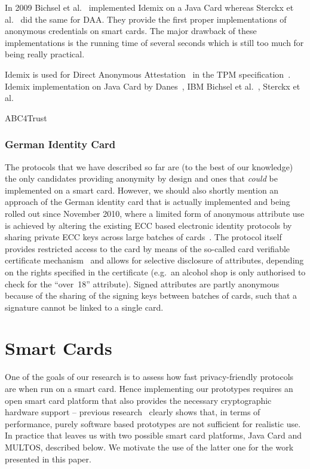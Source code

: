 In 2009 Bichsel et al.~\cite{BichselCGS2009} implemented Idemix on a Java
Card whereas Sterckx et al.~\cite{Sterckx09} did the same for DAA. They
provide the first proper implementations of anonymous credentials on smart
cards. The major drawback of these implementations is the running
time of several seconds which is still too much for being really practical.

Idemix is used for Direct Anonymous Attestation~\cite{BrickellCC2004} in the TPM
specification~\cite{TPM}.
Idemix implementation on Java Card by Danes~\cite{Danes}, IBM Bichsel et al.~\cite{BichselCGS2009}, Sterckx et al.~\cite{Sterckx09}

ABC4Trust

\subsubsection{German Identity Card}

The protocols that we have described so far are (to the best of our
knowledge) the only candidates providing anonymity by design and ones
that \emph{could} be implemented on a smart card. However, we should
also shortly mention an approach of the German identity card that is
actually implemented and being rolled out since November 2010, where a
limited form of anonymous attribute use is achieved by altering the
existing ECC based electronic identity protocols by sharing private ECC
keys across large batches of cards~\cite{Kugler2010}. The protocol itself
provides restricted access to the card by means of the so-called
card verifiable certificate mechanism~\cite{EAC20} and
allows for selective disclosure of attributes, depending on the rights
specified in the certificate (e.g.\ an alcohol shop is only authorised to check for
the ``over~18'' attribute). Signed attributes are partly anonymous
because of the sharing of the signing keys between batches of cards, such
that a signature cannot be linked to a single card.

\section{Smart Cards}

One of the goals of our research is to assess
how fast privacy-friendly protocols are when run on a smart card.
Hence implementing our prototypes requires an open smart card
platform that also provides the necessary cryptographic hardware
support -- previous research~\cite{TewsJacobs09} clearly shows
that, in terms of performance, purely software based prototypes are
not sufficient for realistic use. In practice that leaves us with
two possible smart card platforms, Java Card and MULTOS, described
below. We motivate the use of the latter one for the work presented
in this paper.

